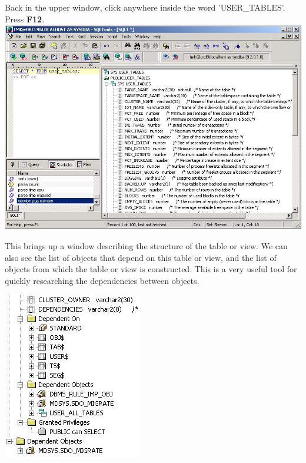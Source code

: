 \documentclass[a4paper,titlepage]{article}
\begin{document}
Back in the upper window, click anywhere inside the word 'USER\_TABLES'. Press \textbf{F12}.\\
\includegraphics[bb=0 0 807 556,width=\textwidth]{01main05}

This brings up a window describing the structure of the table or view. We can also see the list of objects that depend on this table or view, and the list of objects from which the table or view is constructed. This is a very useful tool for quickly researching the dependencies between objects.\\
\begin{center}
\includegraphics[bb=0 0 228 278,scale=.7]{01main06}
\end{center}

\end{document}
